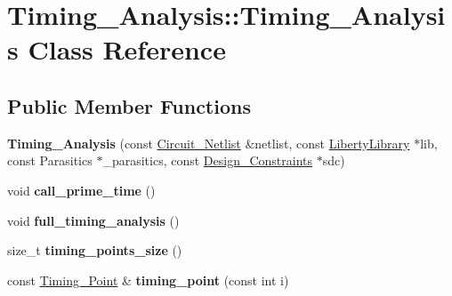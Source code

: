 \hypertarget{classTiming__Analysis_1_1Timing__Analysis}{\section{Timing\-\_\-\-Analysis\-:\-:Timing\-\_\-\-Analysis Class Reference}
\label{classTiming__Analysis_1_1Timing__Analysis}
}
\subsection*{Public Member Functions}
\begin{DoxyCompactItemize}
\item 
\hypertarget{classTiming__Analysis_1_1Timing__Analysis_aea46c3c9e4015f3b6802eca8a9c6d798}{{\bfseries Timing\-\_\-\-Analysis} (const \hyperlink{classCircuit__Netlist}{Circuit\-\_\-\-Netlist} \&netlist, const \hyperlink{classLibertyLibrary}{Liberty\-Library} $\ast$lib, const Parasitics $\ast$\-\_\-parasitics, const \hyperlink{classDesign__Constraints}{Design\-\_\-\-Constraints} $\ast$sdc)}\label{classTiming__Analysis_1_1Timing__Analysis_aea46c3c9e4015f3b6802eca8a9c6d798}

\item 
\hypertarget{classTiming__Analysis_1_1Timing__Analysis_ae98e3de81890f6e7b23b58af151e17ab}{void {\bfseries call\-\_\-prime\-\_\-time} ()}\label{classTiming__Analysis_1_1Timing__Analysis_ae98e3de81890f6e7b23b58af151e17ab}

\item 
\hypertarget{classTiming__Analysis_1_1Timing__Analysis_a16566352c5a2b9da08b2c65fadd774de}{void {\bfseries full\-\_\-timing\-\_\-analysis} ()}\label{classTiming__Analysis_1_1Timing__Analysis_a16566352c5a2b9da08b2c65fadd774de}

\item 
\hypertarget{classTiming__Analysis_1_1Timing__Analysis_accd0fc851f665860214942e93242585b}{size\-\_\-t {\bfseries timing\-\_\-points\-\_\-size} ()}\label{classTiming__Analysis_1_1Timing__Analysis_accd0fc851f665860214942e93242585b}

\item 
\hypertarget{classTiming__Analysis_1_1Timing__Analysis_a15ebc83dc364a1e6ec06723658059377}{const \hyperlink{classTiming__Analysis_1_1Timing__Point}{Timing\-\_\-\-Point} \& {\bfseries timing\-\_\-point} (const int i)}\label{classTiming__Analysis_1_1Timing__Analysis_a15ebc83dc364a1e6ec06723658059377}


\end{DoxyCompactItemize}

